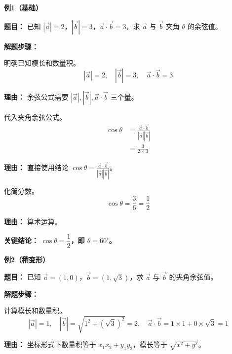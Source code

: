 \begin{examplebox}
	\textbf{\textcolor{CExample}{例1（基础）}}

	\textbf{\textcolor{CExample}{题目：}}
	已知 $|\vec{a}|=2$，$|\vec{b}|=3$，$\vec{a}\cdot\vec{b}=3$，求 $\vec{a}$ 与 $\vec{b}$ 夹角 $\theta$ 的余弦值。

	\textbf{\textcolor{CExample}{解题步骤：}}
	\begin{description}[style=nextline, leftmargin=2.8em, labelsep=0.5em, itemsep=0.45em]
		\item[\textbf{第一步（整理已知量）：}] 明确已知模长和数量积。
			\[
				|\vec{a}|=2,\quad |\vec{b}|=3,\quad \vec{a}\cdot\vec{b}=3
			\]
			\par\textbf{理由：}
			余弦公式需要 $|\vec{a}|,|\vec{b}|,\vec{a}\cdot\vec{b}$ 三个量。

		\item[\textbf{第二步（套用公式）：}] 代入夹角余弦公式。
			\[
				\begin{aligned}
					\cos\theta &= \frac{\vec{a}\cdot\vec{b}}{|\vec{a}||\vec{b}|} \\
					&= \frac{3}{2\times3}
			\end{aligned}
			\]
			\par\textbf{理由：}
			直接使用结论 $\cos\theta = \frac{\vec{a}\cdot\vec{b}}{|\vec{a}||\vec{b}|}$。

		\item[\textbf{第三步（数值计算）：}] 化简分数。
			\[
				\cos\theta = \frac{3}{6} = \frac12
			\]
			\par\textbf{理由：}
			算术运算。
	\end{description}

	\textbf{\textcolor{CExample}{关键结论：}}
	\textbf{$\cos\theta = \dfrac12$，即 $\theta = 60^\circ$。}

	\medskip
	\textbf{\textcolor{CExample}{例2（稍变形）}}

	\textbf{\textcolor{CExample}{题目：}}
	已知 $\vec{a}=(1,0)$，$\vec{b}=(1,\sqrt{3})$，求 $\vec{a}$ 与 $\vec{b}$ 的夹角余弦值。

	\textbf{\textcolor{CExample}{解题步骤：}}
	\begin{description}[style=nextline, leftmargin=2.8em, labelsep=0.5em, itemsep=0.45em]
		\item[\textbf{第一步（坐标运算）：}] 计算模长和数量积。
			\[
				|\vec{a}|=1,\quad |\vec{b}|=\sqrt{1^2+(\sqrt{3})^2}=2,\quad \vec{a}\cdot\vec{b}=1\times1+0\times\sqrt{3}=1
			\]
			\par\textbf{理由：}
			坐标形式下数量积等于 $x_1x_2+y_1y_2$，模长等于 $\sqrt{x^2+y^2}$。


\end{description}
\end{examplebox}
